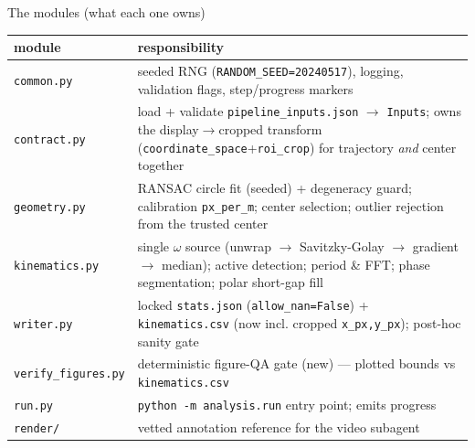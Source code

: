 \documentclass[10pt,aspectratio=169]{beamer}
\newcommand{\gd}[1]{\textcolor{good}{#1}}
\begin{document}
\begin{frame}{The modules (what each one owns)}
\centering\scriptsize
\begin{tabular}{@{}p{2.6cm}p{9.3cm}@{}}
\toprule
module & responsibility \\
\midrule
\texttt{common.py} & seeded RNG (\texttt{RANDOM\_SEED=20240517}), logging, validation flags, step/progress markers \\
\texttt{contract.py} & load + validate \texttt{pipeline\_inputs.json} $\to$ \texttt{Inputs}; \gd{owns the display$\to$cropped transform} (\texttt{coordinate\_space}+\texttt{roi\_crop}) for trajectory \emph{and} center together \\
\texttt{geometry.py} & RANSAC circle fit (seeded) + \gd{degeneracy guard}; calibration \texttt{px\_per\_m}; center selection; outlier rejection from the trusted center \\
\texttt{kinematics.py} & \gd{single $\omega$ source} (unwrap $\to$ Savitzky-Golay $\to$ gradient $\to$ median); active detection; period \& FFT; phase segmentation; \gd{polar short-gap fill} \\
\texttt{writer.py} & locked \texttt{stats.json} (\texttt{allow\_nan=False}) + \texttt{kinematics.csv} (now incl. cropped \texttt{x\_px,y\_px}); post-hoc sanity gate \\
\texttt{verify\_figures.py} & \gd{deterministic figure-QA gate} (new) --- plotted bounds vs \texttt{kinematics.csv} \\
\texttt{run.py} & \texttt{python -m analysis.run} entry point; emits progress \\
\texttt{render/} & vetted annotation reference for the video subagent \\
\bottomrule
\end{tabular}
\end{frame}
\end{document}

